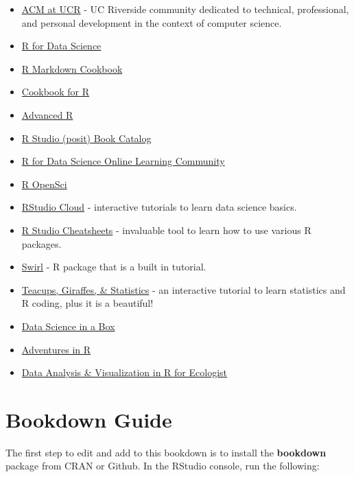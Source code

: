 \documentclass[
]{book}
\providecommand{\tightlist}{%
  \setlength{\itemsep}{0pt}\setlength{\parskip}{0pt}}
\begin{document}
\begin{itemize}
\tightlist
\item
  \href{https://acmucr.org/index.html}{ACM at UCR} - UC Riverside community dedicated to technical, professional, and personal development in the context of computer science.
\item
  \href{https://r4ds.had.co.nz/}{R for Data Science}
\item
  \href{https://bookdown.org/yihui/rmarkdown-cookbook/}{R Markdown Cookbook}
\item
  \href{http://www.cookbook-r.com/}{Cookbook for R}
\item
  \href{https://adv-r.hadley.nz/}{Advanced R}
\item
  \href{https://www.rstudio.com/resources/books/}{R Studio (posit) Book Catalog}
\item
  \href{https://www.rfordatasci.com/}{R for Data Science Online Learning Community}
\item
  \href{https://ropensci.org/}{R OpenSci}
\item
  \href{https://rstudio.cloud/learn/primers}{RStudio Cloud} - interactive tutorials to learn data science basics.
\item
  \href{https://www.rstudio.com/resources/cheatsheets/}{R Studio Cheatsheets} - invaluable tool to learn how to use various R packages.
\item
  \href{https://swirlstats.com/}{Swirl} - R package that is a built in tutorial.
\item
  \href{https://tinystats.github.io/teacups-giraffes-and-statistics/index.html}{Teacups, Giraffes, \& Statistics} - an interactive tutorial to learn statistics and R coding, plus it is a beautiful!
\item
  \href{https://datasciencebox.org/}{Data Science in a Box}
\item
  \href{https://www.adventures-in-r.com/}{Adventures in R}
\item
  \href{https://datacarpentry.org/R-ecology-lesson/}{Data Analysis \& Visualization in R for Ecologist}
\end{itemize}

\hypertarget{bookdown}{%
\chapter{Bookdown Guide}\label{bookdown}}

The first step to edit and add to this bookdown is to install the \textbf{bookdown} package from CRAN or Github. In the RStudio console, run the following:
\end{document}
